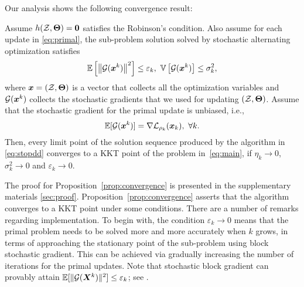 Our analysis shows the following convergence result:
\begin{Prop}\label{prop:convergence}
    Assume $h({\cal Z},\bm \Theta)=\bm 0$ satisfies the Robinson's condition.
    Also assume for each update in \eqref{eq:primal}, the sub-problem solution solved by stochastic alternating optimization satisfies
   \begin{equation}
       \mathbb{E}\left[ \left\| {\cal G}(\boldsymbol{x}^k) \right\|^2\right]\leq \varepsilon_k, ~ \mathbb{V}\left[  {\cal G}(\boldsymbol{x}^k) \right]\leq \sigma_k^2,
   \end{equation}  
   where $\boldsymbol{x}=({\cal Z},\bm \Theta)$ is a vector that collects all the optimization variables and ${\cal G}(\boldsymbol{x}^k)$ collects the stochastic gradients that we used for updating $({\cal Z},\bm \Theta)$.
   Assume that the stochastic gradient for the primal update is unbiased, i.e.,
   \begin{equation}\label{eq:unbiasedness}
       \mathbb{E}[{\cal G}(\boldsymbol{x}^k)] = \nabla {\cal L}_{\rho_k}(\boldsymbol{x}_k),~\forall k. 
   \end{equation}         
   Then, every limit point of the solution sequence produced by the algorithm in \eqref{eq:stopdd} converges to a KKT point of the problem in~\eqref{eq:main}, if $\eta_k\rightarrow 0$, $\sigma_k^2 \rightarrow 0$ and $\varepsilon_k\rightarrow 0$.	
\end{Prop}
The proof for Proposition~\ref{prop:convergence} is presented in the supplementary materials \ref{sec:proof}.
Proposition~\ref{prop:convergence} asserts that the algorithm converges to a KKT point under some conditions. 
   There are a number of remarks regarding implementation.
   To begin with, the condition $\varepsilon_k\rightarrow 0$ means that the primal problem needs to be solved more and more accurately when $k$ grows, in terms of approaching the stationary point of the sub-problem using block stochastic gradient. This can be achieved via gradually increasing the number of iterations for the primal updates. Note that stochastic block gradient can provably attain $\mathbb{E}[\|{\cal G}(\boldsymbol{X}^k)\|^2]\leq \varepsilon_k$; see \cite{xu2015block}. 
